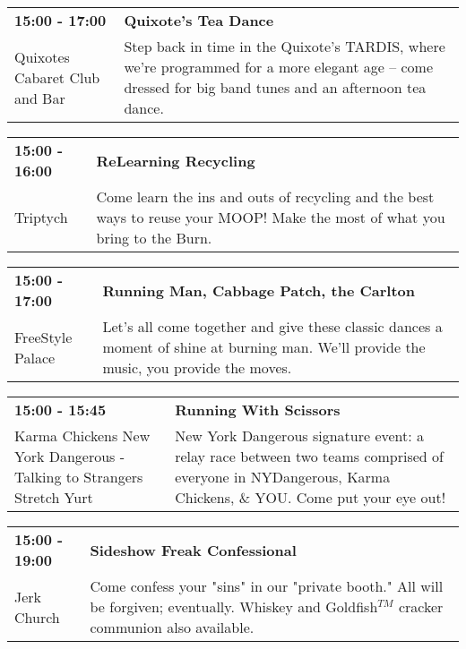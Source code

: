 \begin{tabular}{ p{1in} p{2.2in} }
    \textbf{15:00 - 17:00} & \textbf{Quixote's Tea Dance} \\
    Quixotes Cabaret Club and Bar \newline  & Step back in time in the Quixote's TARDIS, where we're programmed for a more elegant age -- come dressed for big band tunes and an afternoon tea dance. \\
    \hline 
\end{tabular}
    
\begin{tabular}{ p{1in} p{2.2in} }
    \textbf{15:00 - 16:00} & \textbf{ReLearning Recycling} \\
    Triptych \newline  & Come learn the ins and outs of recycling and the best ways to reuse your MOOP! Make the most of what you bring to the Burn. \\
    \hline 
\end{tabular}
    
\begin{tabular}{ p{1in} p{2.2in} }
    \textbf{15:00 - 17:00} & \textbf{Running Man, Cabbage Patch, the Carlton} \\
    FreeStyle Palace \newline  & Let's all come together and give these classic dances a moment of shine at burning man.  We'll provide the music, you provide the moves. \\
    \hline 
\end{tabular}
    
\begin{tabular}{ p{1in} p{2.2in} }
    \textbf{15:00 - 15:45} & \textbf{Running With Scissors} \\
    Karma Chickens \newline New York Dangerous - Talking to Strangers Stretch Yurt & New York Dangerous signature event: a relay race between two teams comprised of everyone in NYDangerous, Karma Chickens, \& YOU. Come put your eye out! \\
    \hline 
\end{tabular}
    
\begin{tabular}{ p{1in} p{2.2in} }
    \textbf{15:00 - 19:00} & \textbf{Sideshow Freak Confessional} \\
    Jerk Church \newline  & Come confess your "sins" in our "private booth." All will be forgiven; eventually. Whiskey and Goldfish$^{TM}$ cracker communion also available. \\
    \hline 
\end{tabular}
    
